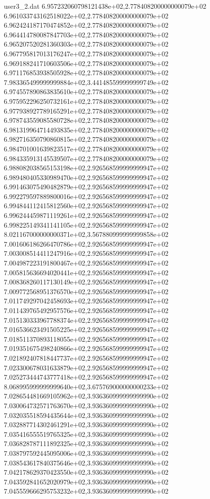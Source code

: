 \begin{filecontents}{user3_2.dat}
6.957232060798121438e+02,2.778408200000000079e+02
6.961033743162518022e+02,2.778408200000000079e+02
6.962424187170474852e+02,2.778408200000000079e+02
6.964414780087847703e+02,2.778408200000000079e+02
6.965207520281360303e+02,2.778408200000000079e+02
6.967795817013176247e+02,2.778408200000000079e+02
6.969188241710603506e+02,2.778408200000000079e+02
6.971176853938505928e+02,2.778408200000000079e+02
7.983365499999999884e+02,3.441485599999999749e+02
6.974557890863835610e+02,2.778408200000000079e+02
6.975952296250732161e+02,2.778408200000000079e+02
6.977938927789165291e+02,2.778408200000000079e+02
6.978743559085580728e+02,2.778408200000000079e+02
6.981319964714493835e+02,2.778408200000000079e+02
6.982716350790860815e+02,2.778408200000000079e+02
6.984701001639823517e+02,2.778408200000000079e+02
6.984335913145539507e+02,2.778408200000000079e+02
6.988082038565153198e+02,2.926568599999999947e+02
6.989480405330989470e+02,2.926568599999999947e+02
6.991463075490482879e+02,2.926568599999999947e+02
6.992279597889800016e+02,2.926568599999999947e+02
6.994844112415812560e+02,2.926568599999999947e+02
6.996244459871119261e+02,2.926568599999999947e+02
6.998225149341141105e+02,2.926568599999999947e+02
8.021167000000000371e+02,3.567880999999999858e+02
7.001606186266470786e+02,2.926568599999999947e+02
7.003008514411247916e+02,2.926568599999999947e+02
7.004987223191800467e+02,2.926568599999999947e+02
7.005815636694020441e+02,2.926568599999999947e+02
7.008368260117130149e+02,2.926568599999999947e+02
7.009772568951376570e+02,2.926568599999999947e+02
7.011749297042458693e+02,2.926568599999999947e+02
7.011439765492957576e+02,2.926568599999999947e+02
7.015130333967788374e+02,2.926568599999999947e+02
7.016536623491505225e+02,2.926568599999999947e+02
7.018511370893118055e+02,2.926568599999999947e+02
7.019351675498240866e+02,2.926568599999999947e+02
7.021892407818447737e+02,2.926568599999999947e+02
7.023300678031633879e+02,2.926568599999999947e+02
7.025273444743777418e+02,2.926568599999999947e+02
8.068995999999999640e+02,3.675769000000000233e+02
7.028654481669105962e+02,3.936360999999999990e+02
7.030064732571763670e+02,3.936360999999999990e+02
7.032035518594435644e+02,3.936360999999999990e+02
7.032887714302461291e+02,3.936360999999999990e+02
7.035416555519765325e+02,3.936360999999999990e+02
7.036828787111892325e+02,3.936360999999999990e+02
7.038797592445095006e+02,3.936360999999999990e+02
7.038543617840375646e+02,3.936360999999999990e+02
7.042178629370423550e+02,3.936360999999999990e+02
7.043592841652020979e+02,3.936360999999999990e+02
7.045559666295753232e+02,3.936360999999999990e+02

\end{filecontents}
